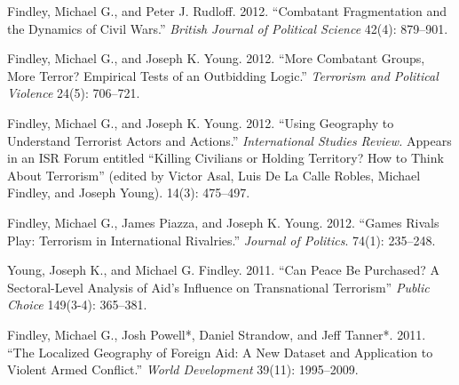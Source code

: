 \documentclass[10pt]{article}
\begin{document}
\begin{etaremune}
\item Findley, Michael G., and Peter J. Rudloff. 2012. ``Combatant Fragmentation and the Dynamics of Civil Wars.'' \textit{British Journal of Political Science} 42(4): 879--901.


\item Findley, Michael G., and Joseph K. Young. 2012. ``More Combatant Groups, More Terror? Empirical Tests of an Outbidding Logic.'' \textit{Terrorism and Political Violence} 24(5): 706--721.


\item Findley, Michael G., and Joseph K. Young. 2012. ``Using Geography to Understand Terrorist Actors and Actions.'' \textit{International Studies Review.} Appears in an ISR Forum entitled ``Killing Civilians or Holding Territory? How to Think About Terrorism'' (edited by Victor Asal, Luis De La Calle Robles, Michael Findley, and Joseph Young). 14(3): 475--497.



\item Findley, Michael G., James Piazza, and Joseph K. Young. 2012. ``Games Rivals Play: Terrorism in International Rivalries.'' \textit{Journal of Politics}. 74(1): 235--248. 


\item Young, Joseph K., and Michael G. Findley. 2011. ``Can Peace Be Purchased? A Sectoral-Level Analysis of Aid's Influence on Transnational Terrorism'' \textit{Public Choice} 149(3-4): 365--381. 



\item Findley, Michael G., Josh Powell*, Daniel Strandow, and Jeff Tanner*. 2011. ``The Localized Geography of Foreign Aid: A New Dataset and Application to Violent Armed Conflict.'' \textit{World Development} 39(11): 1995--2009.


\end{etaremune}
\end{document}
